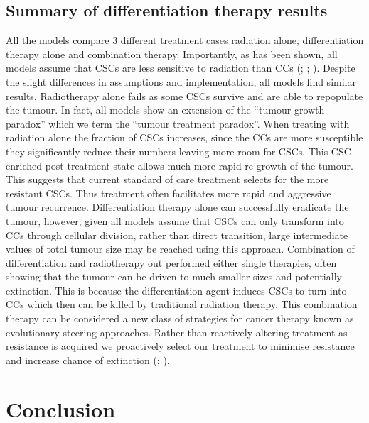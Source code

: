 \documentclass[
  letterpaper,
]{scrreprt}
\theoremstyle{definition}
\theoremstyle{remark}
\begin{document}
\subsection{Summary of differentiation therapy
results}\label{summary-of-differentiation-therapy-results}

All the models compare 3 different treatment cases radiation alone,
differentiation therapy alone and combination therapy. Importantly, as
has been shown, all models assume that CSCs are less sensitive to
radiation than CCs (;
;
). Despite the slight
differences in assumptions and implementation, all models find similar
results. Radiotherapy alone fails as some CSCs survive and are able to
repopulate the tumour. In fact, all models show an extension of the
``tumour growth paradox'' which we term the ``tumour treatment
paradox''. When treating with radiation alone the fraction of CSCs
increases, since the CCs are more susceptible they significantly reduce
their numbers leaving more room for CSCs. This CSC enriched
post-treatment state allows much more rapid re-growth of the tumour.
This suggests that current standard of care treatment selects for the
more resistant CSCs. Thus treatment often facilitates more rapid and
aggressive tumour recurrence. Differentiation therapy alone can
successfully eradicate the tumour, however, given all models assume that
CSCs can only transform into CCs through cellular division, rather than
direct transition, large intermediate values of total tumour size may be
reached using this approach. Combination of differentiation and
radiotherapy out performed either single therapies, often showing that
the tumour can be driven to much smaller sizes and potentially
extinction. This is because the differentiation agent induces CSCs to
turn into CCs which then can be killed by traditional radiation therapy.
This combination therapy can be considered a new class of strategies for
cancer therapy known as evolutionary steering approaches. Rather than
reactively altering treatment as resistance is acquired we proactively
select our treatment to minimise resistance and increase chance of
extinction (; ).

\section{Conclusion}\label{conclusion}
\end{document}
